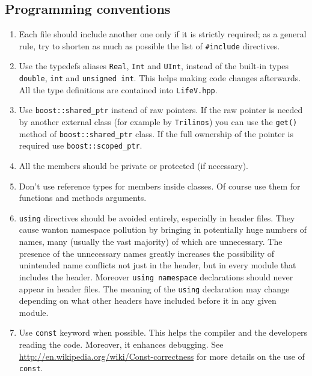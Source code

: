 \documentclass[10p]{article}
\begin{document}
\subsection{Programming conventions}
\begin{enumerate}
  \item Each file should include another one only if it is strictly required; as a general rule, try to shorten as much as possible the list of \texttt{\#include} directives.
  \item Use the typedefs aliases \texttt{Real}, \texttt{Int} and \texttt{UInt}, instead of the built-in types \texttt{double}, \texttt{int} and \texttt{unsigned int}. This helps making code changes afterwards. All the type definitions are contained into \texttt{LifeV.hpp}. %
  \item Use \texttt{boost::shared\_ptr} instead of raw pointers. If the raw pointer is needed by another external class (for example by \texttt{Trilinos}) you can use the \texttt{get()} method of \texttt{boost::shared\_ptr} class. If the full ownership of the pointer is required use \texttt{boost::scoped\_ptr}.
  \item All the members should be private or protected (if necessary).
  \item Don't use reference types for members inside classes. Of course use them for functions and methods arguments.
  \item \texttt{using} directives should be avoided entirely, especially in header files. They cause wanton namespace pollution by bringing in potentially huge numbers of names, many (usually the vast majority) of which are unnecessary. The presence of the unnecessary names greatly increases the possibility of unintended name conflicts not just in the header, but in every module that includes the header. Moreover
  \texttt{using namespace} declarations should never appear in header files. The meaning of the \texttt{using} declaration may change depending on what other headers have included before it in any given module.
  \item Use \texttt{const} keyword when possible. This helps the compiler and the developers reading the code. Moreover, it enhances debugging. See \url{http://en.wikipedia.org/wiki/Const-correctness} for more details on the use of \texttt{const}.

\end{enumerate}
\end{document}

